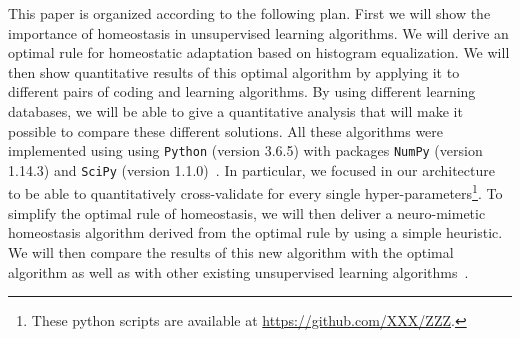 \documentclass[a4paper, 11pt, draft]{article} %
\begin{document}
This paper is organized according to the following plan. First we will show the importance of homeostasis in unsupervised learning algorithms. We will derive an optimal rule for homeostatic adaptation based on histogram equalization. We will then show quantitative results of this optimal algorithm by applying it to different pairs of coding and learning algorithms. By using different learning databases, we will be able to give a quantitative analysis that will make it possible to compare these different solutions. 
All these algorithms were implemented using using \verb+Python+ (version 3.6.5)
with packages \verb+NumPy+ (version 1.14.3) and \verb+SciPy+ (version 1.1.0)~\citep{Oliphant07}.
In particular, we focused in our architecture to be able to quantitatively cross-validate for every single hyper-parameters\footnote{These python scripts are available at \url{https://github.com/XXX/ZZZ}. %
}. %
To simplify the optimal rule of homeostasis, we will then deliver a neuro-mimetic homeostasis algorithm derived from the optimal rule by using a simple heuristic. We will then compare the results of this new algorithm with the optimal algorithm as well as with other existing unsupervised learning algorithms~\citep{Olshausen97, Sandin17}. 
\end{document}
